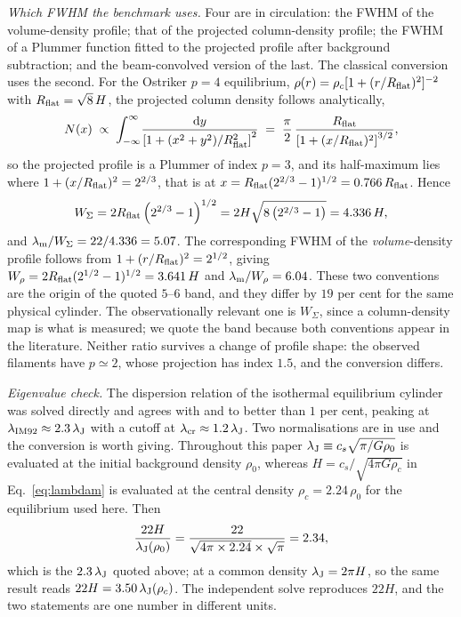 \documentclass[usenatbib,twoside,twocolumn]{mnras}
\begin{document}
\emph{Which FWHM the benchmark uses.} Four are in circulation: the FWHM of the volume-density profile; that of the projected column-density profile; the FWHM of a Plummer function fitted to the projected profile after background subtraction; and the beam-convolved version of the last. The classical conversion uses the second. For the Ostriker $p=4$ equilibrium, $\rho(r)=\rho_c[1+(r/R_{\rm flat})^2]^{-2}$ with $R_{\rm flat}=\sqrt8\,H$, the projected column density follows analytically,
\begin{equation}
N(x)\;\propto\;\int_{-\infty}^{\infty}\!\frac{{\rm d}y}{\left[1+(x^2+y^2)/R_{\rm flat}^2\right]^{2}}\;=\;\frac{\pi}{2}\,\frac{R_{\rm flat}}{\left[1+(x/R_{\rm flat})^{2}\right]^{3/2}},
\label{eq:ostrikercol}
\end{equation}
so the projected profile is a Plummer of index $p=3$, and its half-maximum lies where $1+(x/R_{\rm flat})^{2}=2^{2/3}$, that is at $x=R_{\rm flat}(2^{2/3}-1)^{1/2}=0.766\,R_{\rm flat}$. Hence
\begin{equation}
W_{\Sigma}=2R_{\rm flat}\left(2^{2/3}-1\right)^{1/2}=2H\sqrt{8\left(2^{2/3}-1\right)}=4.336\,H,
\label{eq:wsigma}
\end{equation}
and $\lambda_{\rm m}/W_{\Sigma}=22/4.336=5.07$. The corresponding FWHM of the \emph{volume}-density profile follows from $1+(r/R_{\rm flat})^{2}=2^{1/2}$, giving $W_{\rho}=2R_{\rm flat}(2^{1/2}-1)^{1/2}=3.641\,H$ and $\lambda_{\rm m}/W_{\rho}=6.04$. These two conventions are the origin of the quoted $5$--$6$ band, and they differ by $19$ per cent for the same physical cylinder. The observationally relevant one is $W_{\Sigma}$, since a column-density map is what is measured; we quote the band because both conventions appear in the literature. Neither ratio survives a change of profile shape: the observed filaments have $p\simeq2$, whose projection has index $1.5$, and the conversion differs.

\emph{Eigenvalue check.} The dispersion relation of the isothermal equilibrium cylinder was solved directly and agrees with \citet{Nagasawa1987} and \citet{Fischera2012} to better than $1$ per cent, peaking at $\lambda_{\rm IM92}\approx2.3\,\lambda_{\rm J}$ with a cutoff at $\lambda_{\rm cr}\approx1.2\,\lambda_{\rm J}$. Two normalisations are in use and the conversion is worth giving. Throughout this paper $\lambda_{\rm J}\equiv c_s\sqrt{\pi/G\rho_0}$ is evaluated at the initial background density $\rho_0$, whereas $H=c_s/\sqrt{4\pi G\rho_c}$ in Eq.~\ref{eq:lambdam} is evaluated at the central density $\rho_c=2.24\,\rho_0$ for the equilibrium used here. Then
\begin{equation}
\frac{22H}{\lambda_{\rm J}(\rho_0)}=\frac{22}{\sqrt{4\pi\times2.24}\times\sqrt{\pi}}=2.34,
\label{eq:hconv}
\end{equation}
which is the $2.3\,\lambda_{\rm J}$ quoted above; at a common density $\lambda_{\rm J}=2\pi H$, so the same result reads $22H=3.50\,\lambda_{\rm J}(\rho_c)$. The independent solve reproduces $22H$, and the two statements are one number in different units.
\end{document}
